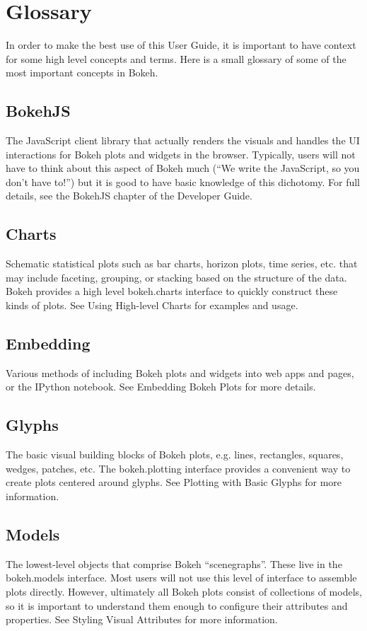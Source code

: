 %

\section{Glossary}
In order to make the best use of this User Guide, it is important to have context for some high level concepts and terms. Here is a small glossary of some of the most important concepts in Bokeh.

\subsection*{BokehJS}
The JavaScript client library that actually renders the visuals and handles the UI interactions for Bokeh plots and widgets in the browser. Typically, users will not have to think about this aspect of Bokeh much (“We write the JavaScript, so you don’t have to!”) but it is good to have basic knowledge of this dichotomy. For full details, see the BokehJS chapter of the Developer Guide.
\subsection*{Charts}
Schematic statistical plots such as bar charts, horizon plots, time series, etc. that may include faceting, grouping, or stacking based on the structure of the data. Bokeh provides a high level bokeh.charts interface to quickly construct these kinds of plots. See Using High-level Charts for examples and usage.
\subsection*{Embedding}
Various methods of including Bokeh plots and widgets into web apps and pages, or the IPython notebook. See Embedding Bokeh Plots for more details.
\subsection*{Glyphs}
The basic visual building blocks of Bokeh plots, e.g. lines, rectangles, squares, wedges, patches, etc. The bokeh.plotting interface provides a convenient way to create plots centered around glyphs. See Plotting with Basic Glyphs for more information.
\subsection*{Models}
The lowest-level objects that comprise Bokeh “scenegraphs”. These live in the bokeh.models interface. Most users will not use this level of interface to assemble plots directly. However, ultimately all Bokeh plots consist of collections of models, so it is important to understand them enough to configure their attributes and properties. See Styling Visual Attributes for more information.
